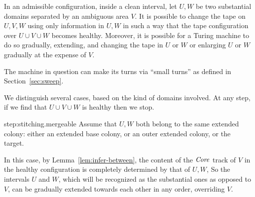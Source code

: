 \documentclass[11pt]{memoir}
\theoremstyle{definition} %
\newcommand{\fld}[1]{\ensuremath{\textit{#1\/}}}
\newcommand{\Core}{\fld{Core}}
\newcommand{\Sweep}{\fld{Sweep}} %
\begin{document}
\begin{lemma}[Stitching]\label{lem:stitching}
In an admissible configuration, inside a clean interval,
let \( U,W \) be two substantial domains separated by an ambiguous area \( V \).
It is possible to change the tape on \( U,V,W \) using only information in \( U,W \) in such a 
way that the tape configuration over \( U\cup V\cup W \) becomes healthy.
Moreover, it is possible for a Turing machine to do so gradually, extending,
and changing the tape in \( U \) or \( W \) or enlarging \( U \) or \( W \)
gradually at the expense of \( V \).

The machine in question can make its turns via
``small turns'' as defined in Section~\ref{sec:sweep}.
\end{lemma}
\begin{Proof}
We distinguish several cases, based on the kind of domains involved.
At any step, if we find that \( U\cup V\cup W \) is healthy then we stop.
\begin{step+}{step:stitching.mergeable}
Assume that \( U,W \) both belong to the same extended colony: either an extended base colony, or 
an outer extended colony, or the target.
\end{step+}
\begin{prooof}
In this case, by Lemma~\ref{lem:infer-between}, the content of the \( \Core \) track 
of \( V \) in the healthy configuration is completely determined by that of \( U,W \),
So the intervals \( U \) and \( W \), which will be recognized as the substantial ones as
opposed to \( V \), can be gradually extended towards each other in any order, 
overriding \( V \).

\end{prooof}
\end{Proof}
\end{document}
